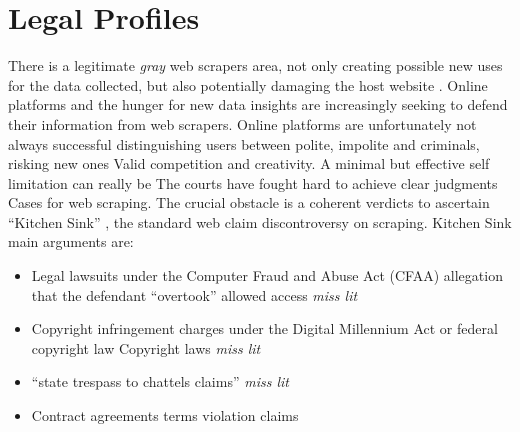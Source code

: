\documentclass[
  12pt,
  a4paper,
  oneside]{book}
\providecommand{\tightlist}{%
  \setlength{\itemsep}{0pt}\setlength{\parskip}{0pt}}
\theoremstyle{definition}
\theoremstyle{definition}
\theoremstyle{definition}
\theoremstyle{remark}
\begin{document}
\hypertarget{legal-profiles}{%
\section{Legal Profiles}\label{legal-profiles}}

There is a legitimate \emph{gray} web scrapers area, not only creating possible new uses for the data collected, but also potentially damaging the host website \citep{WhatCour57}. Online platforms and the hunger for new data insights are increasingly seeking to defend their information from web scrapers. Online platforms are unfortunately not always successful distinguishing users between polite, impolite and criminals, risking new ones Valid competition and creativity. A minimal but effective self limitation can really be
The courts have fought hard to achieve clear judgments Cases for web scraping. The crucial obstacle is a coherent verdicts to ascertain ``Kitchen Sink'' \citep{Kitchens81}, the standard web claim discontroversy on scraping. Kitchen Sink main arguments are:

\begin{itemize}
\tightlist
\item
  Legal lawsuits under the Computer Fraud and Abuse Act (CFAA) allegation that the defendant ``overtook'' allowed access \emph{miss lit}
\item
  Copyright infringement charges under the Digital Millennium Act or federal copyright law Copyright laws \emph{miss lit}
\item
  ``state trespass to chattels claims'' \emph{miss lit}
\item
  Contract agreements terms violation claims
\end{itemize}
\end{document}
